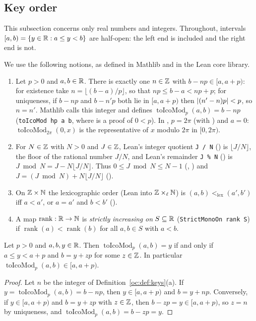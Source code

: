 \subsection{Key order}\label{oc:sub:keys}

This subsection concerns only real numbers and integers. Throughout, intervals $[a,b)=\{y\in\mathbb R:a\le y<b\}$
are half-open: the left end is included and the right end is not.

\begin{definition}\label{oc:def:keys}
We use the following notions, as defined in Mathlib and in the Lean core library.
\begin{enumerate}[label=(\alph*)]
\item Let $p>0$ and $a,b\in\mathbb R$. There is exactly one $n\in\mathbb Z$ with $b-np\in[a,a+p)$: for existence take
  $n=\lfloor(b-a)/p\rfloor$, so that $np\le b-a<np+p$; for uniqueness, if $b-np$ and $b-n'p$ both lie in
  $[a,a+p)$ then $\lvert(n'-n)p\rvert<p$, so $n=n'$. Mathlib calls this integer  and defines
  $\operatorname{toIcoMod}_p(a,b)=b-np$ (\texttt{toIcoMod hp a b}, where  is a proof of $0<p$).
  In , $p=2\pi$ (with ) and $a=0$:
  $\operatorname{toIcoMod}_{2\pi}(0,x)$ is the representative of $x$ modulo $2\pi$ in $[0,2\pi)$.
\item For $N\in\mathbb Z$ with $N>0$ and $J\in\mathbb Z$, Lean's integer quotient \texttt{J / N} () is
  $\lfloor J/N\rfloor$, the floor of the rational number $J/N$, and Lean's remainder \texttt{J \% N}
  () is $J\bmod N=J-N\lfloor J/N\rfloor$. Thus $0\le J\bmod N\le N-1$
  (, ) and $J=(J\bmod N)+N\lfloor J/N\rfloor$
  ().
\item On $\mathbb Z\times\mathbb N$ the lexicographic order (Lean  into $\mathbb Z\times_\ell\mathbb N$) is
  $(a,b)<_{\mathrm{lex}}(a',b')$ iff $a<a'$, or $a=a'$ and $b<b'$ ().
\item A map $\operatorname{rank}:\mathbb R\to\mathbb N$ is \emph{strictly increasing on} $S\subseteq\mathbb R$
  (\texttt{StrictMonoOn rank S}) if $\operatorname{rank}(a)<\operatorname{rank}(b)$ for all $a,b\in S$ with
  $a<b$.
\end{enumerate}
\end{definition}

\begin{lemma}\label{oc:lem:toico}
Let $p>0$ and $a,b,y\in\mathbb R$. Then $\operatorname{toIcoMod}_p(a,b)=y$ if and only if $a\le y<a+p$ and
$b=y+zp$ for some $z\in\mathbb Z$. In particular $\operatorname{toIcoMod}_p(a,b)\in[a,a+p)$.
\end{lemma}
\begin{proof}
Let $n$ be the integer of Definition~\ref{oc:def:keys}(a). If $y=\operatorname{toIcoMod}_p(a,b)=b-np$, then
$y\in[a,a+p)$ and $b=y+np$. Conversely, if $y\in[a,a+p)$ and $b=y+zp$ with $z\in\mathbb Z$, then
$b-zp=y\in[a,a+p)$, so $z=n$ by uniqueness, and $\operatorname{toIcoMod}_p(a,b)=b-zp=y$.
\end{proof}

